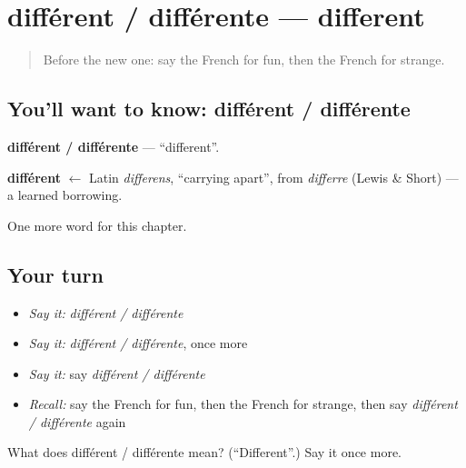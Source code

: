 \section[différent / différente]{différent / différente — different}

\label{lesson:FR-C219-different-differente}



\begin{quote}
Before the new one: say the French for fun, then the French for strange.
\end{quote}

\subsection*{You'll want to know: différent / différente}
\textbf{différent / différente} — \textquotedblleft{}different\textquotedblright{}.

\begin{cousinweb}
\textbf{différent} $\leftarrow$ Latin \emph{differens}, \textquotedblleft{}carrying apart\textquotedblright{}, from \emph{differre} (Lewis \& Short) — a learned borrowing.
\end{cousinweb}

\begin{grammarlens}[title={What you've built}]
One more word for this chapter.
\end{grammarlens}

\subsection*{Your turn}
\begin{itemize}
\raggedright
  \item \emph{Say it:} \emph{différent / différente}
  \item \emph{Say it:} \emph{différent / différente}, once more
  \item \emph{Say it:} say \emph{différent / différente}
  \item \emph{Recall:} say the French for fun, then the French for strange, then say \emph{différent / différente} again
\end{itemize}

\begin{tcolorbox}[breakable,colback=teal!4,colframe=teal!35!black,title={Before you move on}]
What does différent / différente mean? (\textquotedblleft{}Different\textquotedblright{}.) Say it once more.
\end{tcolorbox}
